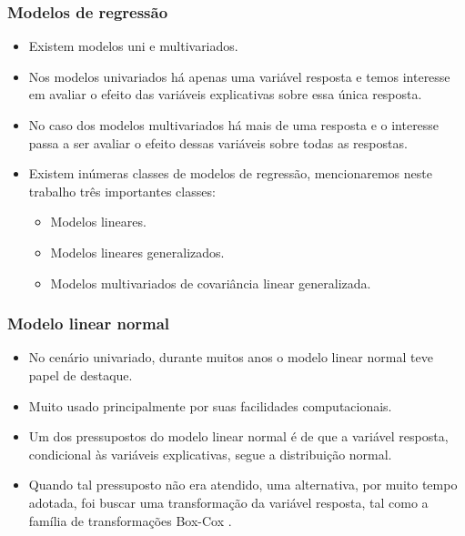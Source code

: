 \documentclass[handout,serif, professionalfont, usenames, dvipsnames, aspectratio = 169]{beamer}\usepackage[]{graphicx}\usepackage[]{color}
\begin{document}

\begin{frame}
  \frametitle{Modelos de regressão}

  \begin{itemize}
    \itemsep 2ex

  \item Existem modelos uni e multivariados. 
  
  \item Nos modelos univariados há apenas uma variável resposta e temos interesse em avaliar o efeito das variáveis explicativas sobre essa única resposta.
  
  \item No caso dos modelos multivariados há mais de uma resposta e o interesse passa a ser avaliar o efeito dessas variáveis sobre todas as respostas. 
  
  \item Existem inúmeras classes de modelos de regressão, mencionaremos neste trabalho três importantes classes: 
  \begin{itemize}
  \item Modelos lineares.
  \item Modelos lineares generalizados.
  \item Modelos multivariados de covariância linear generalizada. 
\end{itemize}

  \end{itemize}
\end{frame}



\begin{frame}
  \frametitle{Modelo linear normal}

  \begin{itemize}
    \itemsep 2ex

  \item No cenário univariado, durante muitos anos o modelo linear normal \cite{galton} teve papel de destaque.
  
  \item Muito usado principalmente por suas facilidades computacionais. 
  
  \item Um dos pressupostos do modelo linear normal é de que a variável resposta, condicional às variáveis explicativas, segue a distribuição normal. 
  
  \item Quando tal pressuposto não era atendido, uma alternativa, por muito tempo adotada, foi buscar uma transformação da variável resposta, tal como a família de transformações Box-Cox \cite{boxcox64}. 
  
  \end{itemize}
\end{frame}
\end{document}
